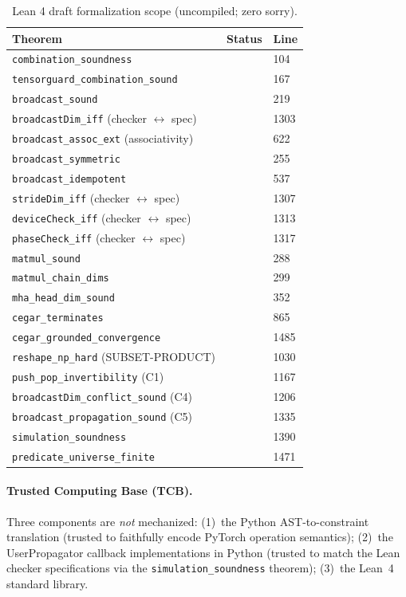 \documentclass[11pt]{article}
\newcommand{\cmark}{\ding{51}}
\begin{document}
\begin{table}[h]
\centering
\caption{Lean 4 draft formalization scope (uncompiled; zero sorry).}
\label{tab:lean-scope}
\small
\begin{tabular}{@{}p{5.5cm}ll@{}}
\toprule
\textbf{Theorem} & \textbf{Status} & \textbf{Line} \\
\midrule
\texttt{combination\_soundness} & \cmark & 104 \\
\texttt{tensorguard\_combination\_sound} & \cmark & 167 \\
\texttt{broadcast\_sound} & \cmark & 219 \\
\texttt{broadcastDim\_iff} (checker $\leftrightarrow$ spec) & \cmark & 1303 \\
\texttt{broadcast\_assoc\_ext} (associativity) & \cmark & 622 \\
\texttt{broadcast\_symmetric} & \cmark & 255 \\
\texttt{broadcast\_idempotent} & \cmark & 537 \\
\texttt{strideDim\_iff} (checker $\leftrightarrow$ spec) & \cmark & 1307 \\
\texttt{deviceCheck\_iff} (checker $\leftrightarrow$ spec) & \cmark & 1313 \\
\texttt{phaseCheck\_iff} (checker $\leftrightarrow$ spec) & \cmark & 1317 \\
\texttt{matmul\_sound} & \cmark & 288 \\
\texttt{matmul\_chain\_dims} & \cmark & 299 \\
\texttt{mha\_head\_dim\_sound} & \cmark & 352 \\
\texttt{cegar\_terminates} & \cmark & 865 \\
\texttt{cegar\_grounded\_convergence} & \cmark & 1485 \\
\texttt{reshape\_np\_hard} (SUBSET-PRODUCT) & \cmark & 1030 \\
\texttt{push\_pop\_invertibility} (C1) & \cmark & 1167 \\
\texttt{broadcastDim\_conflict\_sound} (C4) & \cmark & 1206 \\
\texttt{broadcast\_propagation\_sound} (C5) & \cmark & 1335 \\
\texttt{simulation\_soundness} & \cmark & 1390 \\
\texttt{predicate\_universe\_finite} & \cmark & 1471 \\
\bottomrule
\end{tabular}
\end{table}

\paragraph{Trusted Computing Base (TCB).}
Three components are \emph{not} mechanized:
(1)~the Python AST-to-constraint translation (trusted to faithfully
encode PyTorch operation semantics);
(2)~the UserPropagator callback implementations in Python (trusted
to match the Lean checker specifications via the \texttt{simulation\_soundness}
theorem);
(3)~the Lean~4 standard library.
\end{document}
